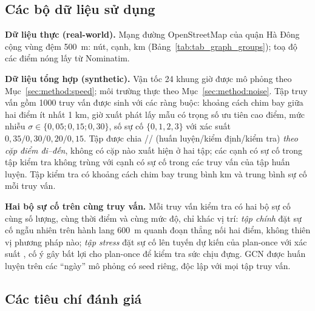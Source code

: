 \subsection{Các bộ dữ liệu sử dụng}\label{sec:exp:data}

\textbf{Dữ liệu thực (real-world).} Mạng đường OpenStreetMap của quận Hà Đông cộng vùng đệm 500~m: \NNodes{} nút,
\NEdges{} cạnh, \TotalKm{} km (Bảng~\ref{tab:tab_graph_groups}); toạ độ các điểm nóng lấy từ Nominatim.

\textbf{Dữ liệu tổng hợp (synthetic).} Vận tốc 24 khung giờ được mô phỏng theo Mục~\ref{sec:method:speed}; môi trường thực
theo Mục~\ref{sec:method:noise}. Tập truy vấn gồm 1000 truy vấn được sinh với các ràng buộc: khoảng cách chim bay giữa hai
điểm ít nhất 1 km, giờ xuất phát lấy mẫu có trọng số ưu tiên cao điểm, mức nhiễu $\sigma\in\{0{,}05;0{,}15;0{,}30\}$, số sự
cố $\{0,1,2,3\}$ với xác suất $0{,}35/0{,}30/0{,}20/0{,}15$. Tập được chia \NTrain/\NVal/\NTest{} (huấn luyện/kiểm
định/kiểm tra) \emph{theo cặp điểm đi--đến}, không có cặp nào xuất hiện ở hai tập; các cạnh có sự cố trong tập kiểm tra
không trùng với cạnh có sự cố trong các truy vấn của tập huấn luyện. Tập kiểm tra có khoảng cách chim bay trung bình \TestMeanDistKm{} km và trung bình
\TestMeanInc{} sự cố mỗi truy vấn.

\textbf{Hai bộ sự cố trên cùng truy vấn.} Mỗi truy vấn kiểm tra có hai bộ sự cố cùng số lượng, cùng thời điểm và cùng mức
độ, chỉ khác vị trí: \emph{tập chính} đặt sự cố ngẫu nhiên trên hành lang 600~m quanh đoạn thẳng nối hai điểm, không thiên
vị phương pháp nào; \emph{tập stress} đặt sự cố lên tuyến dự kiến của plan-once với xác suất \StressProb, cố ý gây bất lợi
cho plan-once để kiểm tra sức chịu đựng. GCN được huấn luyện trên các ``ngày'' mô phỏng có seed riêng, độc lập với mọi tập
truy vấn.

\subsection{Các tiêu chí đánh giá}\label{sec:exp:metrics}

